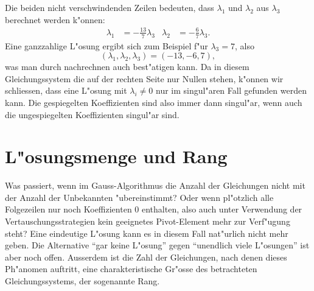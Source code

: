 \begin{beispiel}
Die beiden nicht verschwindenden Zeilen bedeuten, dass $\lambda_1$ und
$\lambda_2$ aus $\lambda_3$ berechnet werden k"onnen:
\begin{align*}
\lambda_1&=-\frac{13}7\lambda_3&\lambda_2&=-\frac{6}7\lambda_3.
\end{align*}
Eine ganzzahlige L"osung ergibt sich zum Beispiel f"ur $\lambda_3=7$,
also
\[
(
\lambda_1,
\lambda_2,
\lambda_3
)
=(
-13,-6,7
),
\]
was man durch nachrechnen auch best"atigen kann.
Da in diesem Gleichungssystem
die auf der rechten Seite nur Nullen stehen, k"onnen wir schliessen,
dass eine L"osung mit $\lambda_i\ne 0$ nur im singul"aren Fall gefunden
werden kann.
Die gespiegelten Koeffizienten sind also immer dann singul"ar,
wenn auch die ungespiegelten Koeffizienten singul"ar sind.
\end{beispiel}

\section{L"osungsmenge und Rang}
Was passiert, wenn im Gauss-Algorithmus die Anzahl der Gleichungen
nicht mit der Anzahl der Unbekannten "ubereinstimmt? Oder wenn
pl"otzlich alle Folgezeilen nur noch Koeffizienten $0$ enthalten,
also auch unter Verwendung der Vertauschungsstrategien kein geeignetes
Pivot-Element mehr zur Verf"ugung steht? Eine eindeutige L"osung kann
es in diesem Fall nat"urlich nicht mehr geben.
Die Alternative ``gar keine L"osung'' gegen ``unendlich viele L"osungen''
ist aber noch offen.
Ausserdem ist die Zahl der Gleichungen, nach denen dieses Ph"anomen
auftritt, eine charakteristische Gr"osse des betrachteten Gleichungssystems,
der sogenannte Rang.

